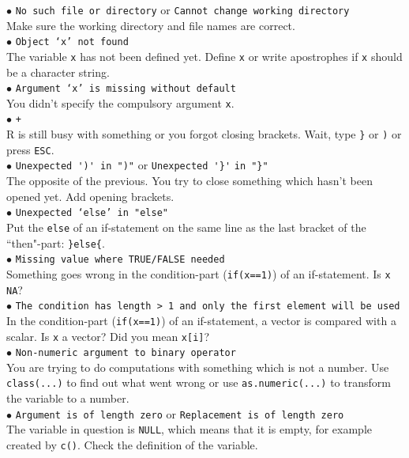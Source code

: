 \documentclass[a4paper,11pt,twocolumn,tablecaptionabove]{scrartcl}
\begin{document}
\noindent $\bullet$ \texttt{No such file or directory} or \texttt{Cannot change working directory} \\
Make sure the working directory and file names are correct.\\
\noindent $\bullet$ \texttt{Object `x' not found}\\
The variable \texttt{x} has not been defined yet. Define \texttt{x} or write apostrophes if \texttt{x} should be a character string.\\
\noindent $\bullet$ \texttt{Argument `x' is missing without default}\\
You didn't specify the compulsory argument \texttt{x}.\\
\noindent $\bullet$ \texttt{+}\\ %
R is still busy with something or you forgot closing brackets. Wait, type \verb!}! or \verb!)! or press \texttt{ESC}.\\ %
\noindent $\bullet$ \verb!Unexpected ')' in ")"! or \verb!Unexpected '}'! \verb!in "}"!\\ 
The opposite of the previous. You try to close something which hasn't been opened yet. Add opening brackets.\\
\noindent $\bullet$ \texttt{Unexpected `else' in "else"}\\
Put the \verb!else! of an if-statement on the same line as the last bracket of the ``then"-part: \verb!}else{!.\\
\noindent $\bullet$ \texttt{Missing value where TRUE/FALSE needed}\\
Something goes wrong in the condition-part (\texttt{if(x==1)}) of an if-statement. Is \texttt{x} \texttt{NA}? \\
\noindent $\bullet$ \texttt{The condition has length > 1 and only the first element will be used}\\
In the condition-part (\texttt{if(x==1)}) of an if-statement, a vector is compared with a scalar. Is \texttt{x} a vector? Did you mean \texttt{x[i]}?\\
\noindent $\bullet$ \texttt{Non-numeric argument to binary operator} \\
You are trying to do computations with something which is not a number. Use \texttt{class(...)} to find out what went wrong or use \texttt{as.numeric(...)} to transform the variable to a number.\\
\noindent $\bullet$ \texttt{Argument is of length zero} or \texttt{Replacement is of length zero}\\
The variable in question is \texttt{NULL}, which means that it is empty, for example created by \texttt{c()}. Check the definition of the variable.
\end{document}
